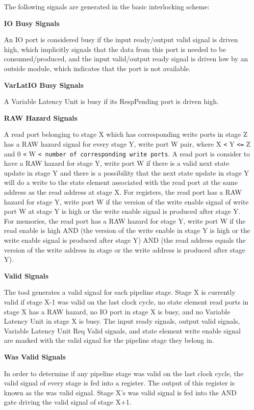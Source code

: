 The following signals are generated in the basic interlocking scheme:

{\bf IO Busy Signals}

An IO port is considered busy if the input ready/output valid signal is driven high, which implicitly signals that the data from this port is needed to be consumed/produced, and the input valid/output ready signal is driven low by an outside module, which indicates that the port is not available.


{\bf VarLatIO Busy Signals}

A Variable Latency Unit is busy if its RespPending port is driven high.


{\bf RAW Hazard Signals}

A read port belonging to stage X which has corresponding write ports in stage Z has a RAW hazard signal for every stage Y, write port W pair, where X {\tt <} Y {\tt <=} Z and 0 {\tt <} W {\tt < number of corresponding write ports}. A read port is consider to have a RAW hazard for stage Y, write port W if there is a valid next state update in stage Y and there is a possibility that the next state update in stage Y will do a write to the state element associated with the read port at the same address as the read address at stage X. For registers, the read port has a RAW hazard for stage Y, write port W if the version of the write enable signal of write port W at stage Y is high or the write enable signal is produced after stage Y. For memories, the read port has a RAW hazard for stage Y, write port W if the read enable is high AND (the version of the write enable in stage Y is high or the write enable signal is produced after stage Y) AND (the read address equals the version of the write address in stage or the write address is produced after stage Y).


{\bf Valid Signals}

The tool generates a valid signal for each pipeline stage. Stage X is currently valid if stage X-1 was valid on the last clock cycle, no state element read ports in stage X has a RAW hazard, no IO port in stage X is busy, and no Variable Latency Unit in stage X is busy. The input ready signals, output valid signals, Variable Latency Unit Req Valid signals, and state element write enable signal are masked with the valid signal for the pipeline stage they belong in.


{\bf Was Valid Signals}

In order to determine if any pipeline stage was valid on the last clock cycle, the valid signal of every stage is fed into a register. The output of this register is known as the was valid signal. Stage X's was valid signal is fed into the AND gate driving the valid signal of stage X+1.


